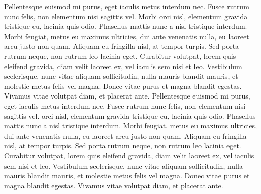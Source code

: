 \documentclass{article}
\begin{document}
  Pellentesque euismod mi purus, eget iaculis metus interdum nec.
 Fusce rutrum nunc felis, non elementum nisi sagittis vel.
 Morbi orci nisl, elementum gravida tristique eu, lacinia quis odio.
 Phasellus mattis nunc a nisl tristique interdum.
 Morbi feugiat, metus eu maximus ultricies, dui ante venenatis nulla, eu laoreet arcu justo non quam.
 Aliquam eu fringilla nisl, at tempor turpis.
 Sed porta rutrum neque, non rutrum leo lacinia eget.
 Curabitur volutpat, lorem quis eleifend gravida, diam velit laoreet ex, vel iaculis sem nisi et leo.
 Vestibulum scelerisque, nunc vitae aliquam sollicitudin, nulla mauris blandit mauris, et molestie metus felis vel magna.
 Donec vitae purus et magna blandit egestas.
 Vivamus vitae volutpat diam, et placerat ante.
Pellentesque euismod mi purus, eget iaculis metus interdum nec.
 Fusce rutrum nunc felis, non elementum nisi sagittis vel.
  orci nisl, elementum gravida tristique eu, lacinia quis odio.
 Phasellus mattis nunc a nisl tristique interdum.
 Morbi feugiat, metus eu maximus ultricies, dui ante venenatis nulla, eu laoreet arcu justo non quam.
 Aliquam eu fringilla nisl, at tempor turpis.
 Sed porta rutrum neque, non rutrum leo lacinia eget.
 Curabitur volutpat, lorem quis eleifend gravida, diam velit laoreet ex, vel iaculis sem nisi et leo.
 Vestibulum scelerisque, nunc vitae aliquam sollicitudin, nulla mauris blandit mauris, et molestie metus felis vel magna.
 Donec vitae purus et magna blandit egestas.
 Vivamus vitae volutpat diam, et placerat ante.

 


\endnumbering
\end{document}
